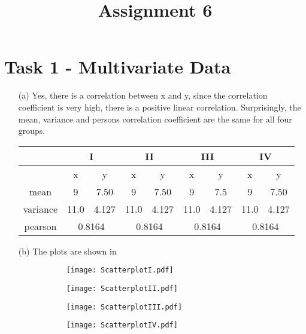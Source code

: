 \documentclass[a4paper]{article}
\date{}
\author{}
\title{\textbf{Assignment 6}}
\begin{document}
\maketitle 
\thispagestyle{fancy}

\section*{Task 1 - Multivariate Data}

\begin{enumerate}
	\item[(a)]
	Yes, there is a correlation between x and y, since the correlation coefficient is very high, there is a positive linear correlation. 
	Surprisingly, the mean, variance and persons correlation coefficient are the same for all four groups. 
	
	
	\begin{tabular}{| c |c c | c c | c c | c c|} \hline
		&\multicolumn{2}{|c|}{I} & \multicolumn{2}{|c|}{II} &
		\multicolumn{2}{c|}{III} & \multicolumn{2}{|c|}{IV} \\ \hline
		&x & y & x & y & x & y & x & y\\ \hline 
		mean & 9 & 7.50 &9 &7.50&9&7.5&9&7.50\\ \hline 
		variance & 11.0 & 4.127 & 11.0 & 4.127  & 11.0 & 4.127 & 11.0 & 4.127 \\ \hline
		pearson & \multicolumn{2}{|c|}{0.8164}  &   \multicolumn{2}{|c|}{0.8164} &  
		 \multicolumn{2}{|c|}{0.8164}  &   \multicolumn{2}{|c|}{0.8164} \\ \hline  
		
	\end{tabular}

	
	\item[(b)] The plots are shown in  \\
	\begin{figure}[!ht]
		\centering
		\begin{subfigure}{.35\textwidth}
			\texttt{[image: ScatterplotI.pdf]}
		\end{subfigure}		
		\begin{subfigure}{.35\textwidth}
			\texttt{[image: ScatterplotII.pdf]}
		\end{subfigure}
		\begin{subfigure}{.35\textwidth}
			\texttt{[image: ScatterplotIII.pdf]}
		\end{subfigure}
		\begin{subfigure}{.35\textwidth}
			\texttt{[image: ScatterplotIV.pdf]}
		\end{subfigure}		
		

\end{figure}
\end{enumerate}
\end{document}
